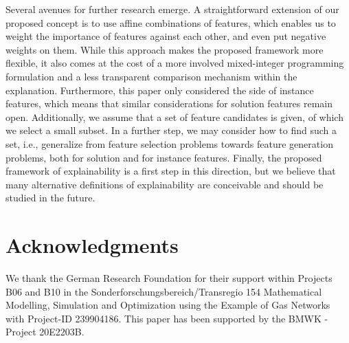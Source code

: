 \documentclass[11pt, a4paper]{article}
\begin{document}
Several avenues for further research emerge. A straightforward extension of our proposed concept is to use affine combinations of features, which enables us to weight the importance of features against each other, and even put negative weights on them. While this approach makes the proposed framework more flexible, it also comes at the cost of a more involved mixed-integer programming formulation and a less transparent comparison mechanism within the explanation. Furthermore, this paper only considered the side of instance features, which means that similar considerations for solution features remain open. Additionally, we assume that a set of feature candidates is given, of which we select a small subset. In a further step, we may consider how to find such a set, i.e., generalize from feature selection problems towards feature generation problems, both for solution and for instance features. Finally, the proposed framework of explainability is a first step in this direction, but we believe that many alternative definitions of explainability are conceivable and should be studied in the future.




\section*{Acknowledgments}
We thank the German Research Foundation for their support within Projects B06 and B10 in the Sonderforschungsbereich/Transregio 154 Mathematical Modelling, Simulation and Optimization using the Example of Gas Networks with Project-ID 239904186. This paper has been supported by the BMWK - Project 20E2203B.








%


\end{document}
